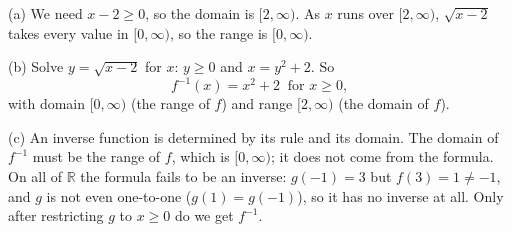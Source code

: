 (a) We need $x-2\ge0$, so the domain is $[2,\infty)$. As $x$ runs over $[2,\infty)$, $\sqrt{x-2}$ takes every value in $[0,\infty)$, so the range is $[0,\infty)$.

(b) Solve $y=\sqrt{x-2}$ for $x$: $y\ge0$ and $x=y^2+2$. So
\[
\boxed{f^{-1}(x)=x^2+2\ \text{ for } x\ge0},
\]
with domain $[0,\infty)$ (the range of $f$) and range $[2,\infty)$ (the domain of $f$).

(c) An inverse function is determined by its rule and its domain. The domain of $f^{-1}$ must be the range of $f$, which is $[0,\infty)$; it does not come from the formula. On all of $\mathbb R$ the formula fails to be an inverse: $g(-1)=3$ but $f(3)=1\ne-1$, and $g$ is not even one-to-one ($g(1)=g(-1)$), so it has no inverse at all. Only after restricting $g$ to $x\ge0$ do we get $f^{-1}$.
